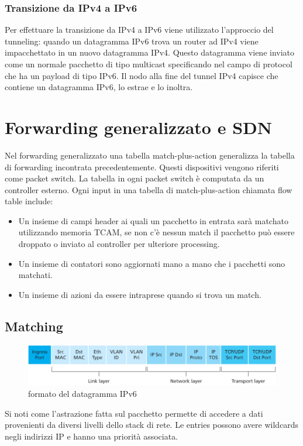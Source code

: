 \subsubsection{Transizione da IPv4 a IPv6}
Per effettuare la transizione da IPv4 a IPv6 viene utilizzato l'approccio del tunneling: quando un datagramma IPv6 trova un router ad IPv4 viene 
impacchettato in un nuovo datagramma IPv4. Questo datagramma viene inviato come un normale pacchetto di tipo multicast specificando nel  campo di protocol che ha un payload di tipo IPv6. Il nodo alla 
fine del tunnel IPv4 capisce che contiene un datagramma IPv6, lo estrae e lo inoltra. 
\section{Forwarding generalizzato e SDN}
Nel forwarding generalizzato una tabella match-plus-action generalizza la tabella di forwarding incontrata precedentemente. Questi dispositivi vengono 
riferiti come packet switch. La tabella in ogni packet switch \`e computata da un controller esterno. Ogni input in una tabella di match-plus-action 
chiamata flow table include:
\begin{itemize}
\item Un insieme di campi header ai quali un pacchetto in entrata sar\`a matchato utilizzando memoria TCAM, se non c'\`e nessun match il pacchetto pu\`o 
essere droppato o inviato al controller per ulteriore processing. 
\item Un insieme di contatori sono aggiornati mano a mano che i pacchetti sono matchati.
\item Un insieme di azioni da essere intraprese quando si trova un match. 
\end{itemize}
\subsection{Matching}
\begin{figure}[h]
\includegraphics[width=\textwidth]{Pictures/FlowTableEntry.png}
\caption{formato del datagramma IPv6}
\end{figure}
Si noti come l'astrazione fatta sul pacchetto permette di accedere a dati provenienti da diversi livelli dello stack di rete. Le entries possono avere 
wildcards negli indirizzi IP e hanno una priorit\`a associata. 
